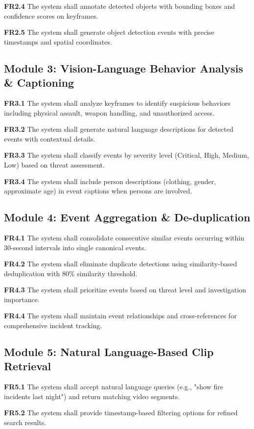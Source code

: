 \documentclass[12pt,a4paper]{article}
\begin{document}
\textbf{FR2.4} The system shall annotate detected objects with bounding boxes and confidence scores on keyframes.

\textbf{FR2.5} The system shall generate object detection events with precise timestamps and spatial coordinates.

\subsection{Module 3: Vision-Language Behavior Analysis \& Captioning}
\textbf{FR3.1} The system shall analyze keyframes to identify suspicious behaviors including physical assault, weapon handling, and unauthorized access.

\textbf{FR3.2} The system shall generate natural language descriptions for detected events with contextual details.

\textbf{FR3.3} The system shall classify events by severity level (Critical, High, Medium, Low) based on threat assessment.

\textbf{FR3.4} The system shall include person descriptions (clothing, gender, approximate age) in event captions when persons are involved.

\subsection{Module 4: Event Aggregation \& De-duplication}
\textbf{FR4.1} The system shall consolidate consecutive similar events occurring within 30-second intervals into single canonical events.

\textbf{FR4.2} The system shall eliminate duplicate detections using similarity-based deduplication with 80\% similarity threshold.

\textbf{FR4.3} The system shall prioritize events based on threat level and investigation importance.

\textbf{FR4.4} The system shall maintain event relationships and cross-references for comprehensive incident tracking.

\subsection{Module 5: Natural Language-Based Clip Retrieval}
\textbf{FR5.1} The system shall accept natural language queries (e.g., "show fire incidents last night") and return matching video segments.

\textbf{FR5.2} The system shall provide timestamp-based filtering options for refined search results.
\end{document}

